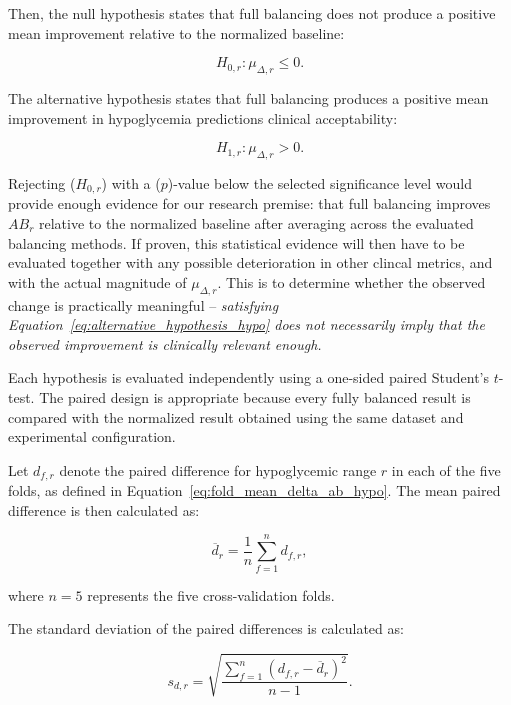 Then, the null hypothesis states that full balancing does not produce a positive mean improvement relative to the normalized baseline:

\begin{equation}
H_{0,r}:
\mu_{\Delta,r} \leq 0.
\label{eq:null_hypothesis_hypo}
\end{equation}

The alternative hypothesis states that full balancing produces a positive mean improvement in hypoglycemia predictions clinical acceptability:

\begin{equation}
H_{1,r}:
\mu_{\Delta,r} > 0.
\label{eq:alternative_hypothesis_hypo}
\end{equation}

Rejecting ($H_{0,r}$) with a ($p$)-value below the selected significance level would provide enough evidence for our research premise: that full balancing improves \(AB_r\) relative to the normalized baseline after averaging across the evaluated balancing methods. If proven, this statistical evidence will then have to be evaluated together with any possible deterioration in other clincal metrics, and with the actual magnitude of \(\mu_{\Delta,r}\). This is to determine whether the observed change is practically meaningful -- \textit{satisfying Equation~\ref{eq:alternative_hypothesis_hypo} does not necessarily imply that the observed improvement is clinically relevant enough.}

Each hypothesis is evaluated independently using a one-sided paired Student's \(t\)-test. The paired design is appropriate because every fully balanced result is compared with the normalized result obtained using the same dataset and experimental configuration.

Let $d_{f,r}$ denote the paired difference for hypoglycemic range $r$ in each of the five folds, as defined in Equation~\ref{eq:fold_mean_delta_ab_hypo}. The mean paired difference is then calculated as:

\begin{equation}
\overline{d}_r
=
\frac{1}{n}
\sum_{f=1}^{n} d_{f,r},
\label{eq:mean_paired_difference}
\end{equation}

where \(n=5\) represents the five cross-validation folds.

The standard deviation of the paired differences is calculated as:

\begin{equation}
s_{d,r}
=
\sqrt{
\frac{
\sum_{f=1}^{n}
\left(
d_{f,r}-\overline{d}_r
\right)^2
}{
n-1
}
}.
\label{eq:paired_difference_sd}
\end{equation}

